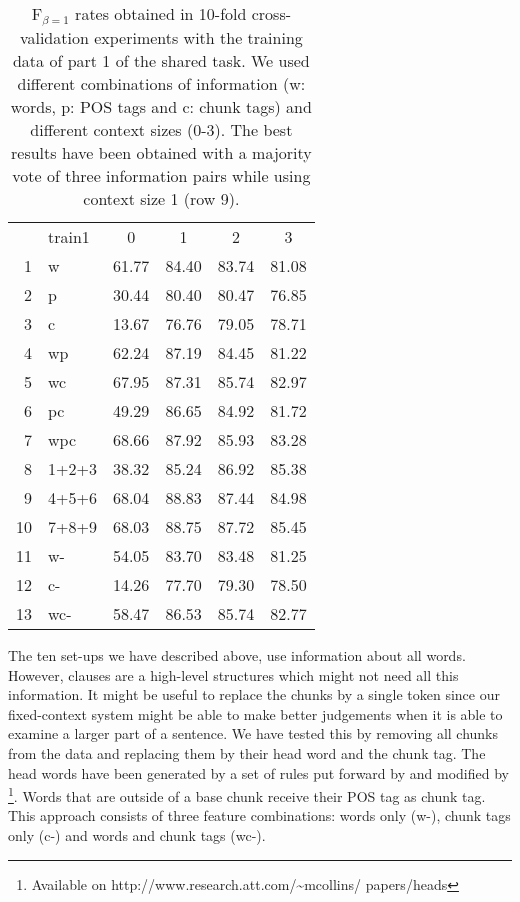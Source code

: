 \documentclass[11pt]{article}
\begin{document}
\begin{table}[t]
\begin{center}
\begin{tabular}{ r|l|c|c|c|c|}\cline{3-6}
\multicolumn{1}{l}{} & \multicolumn{1}{l|}{train1} & 
 0 & 1 & 2 & 3 \\\cline{2-6}
 1 & w         & 61.77 & 84.40 & 83.74 & 81.08\\
 2 & p         & 30.44 & 80.40 & 80.47 & 76.85\\
 3 & c         & 13.67 & 76.76 & 79.05 & 78.71\\
 4 & wp        & 62.24 & 87.19 & 84.45 & 81.22\\
 5 & wc        & 67.95 & 87.31 & 85.74 & 82.97\\
 6 & pc        & 49.29 & 86.65 & 84.92 & 81.72\\
 7 & wpc       & 68.66 & 87.92 & 85.93 & 83.28\\\cline{2-6}
 8 & 1+2+3     & 38.32 & 85.24 & 86.92 & 85.38\\
 9 & 4+5+6     & 68.04 & 88.83 & 87.44 & 84.98\\
10 & 7+8+9     & 68.03 & 88.75 & 87.72 & 85.45\\\cline{2-6}
11 & w-        & 54.05 & 83.70 & 83.48 & 81.25\\
12 & c-        & 14.26 & 77.70 & 79.30 & 78.50\\
13 & wc-       & 58.47 & 86.53 & 85.74 & 82.77\\\cline{2-6}
\end{tabular}
\end{center}
\caption{
F$_{\beta=1}$ rates obtained in 10-fold cross-validation experiments
with the training data of part 1 of the shared task.
We used different combinations of information (w: words, p: POS tags
and c: chunk tags) and different context sizes (0-3).
The best results have been obtained with a majority vote of three
information pairs while using context size 1 (row 9).
} 
\label{tab-result1}
\end{table}

The ten set-ups we have described above, use information about all
words.
However, clauses are a high-level structures which might not need
all this information.
It might be useful to replace the chunks by a single token since our
fixed-context system might be able to make better judgements when
it is able to examine a larger part of a sentence.
We have tested this by removing all chunks from the data and replacing 
them by their head word and the chunk tag.
The head words have been generated by a set of rules put
forward by \cite{magerman95} and modified by 
\cite{collins99}\footnote{Available on
http://www.research.att.com/\~{ }mcollins/ papers/heads}.
Words that are outside of a base chunk receive their POS tag as chunk
tag.
This approach consists of three feature combinations:
words only (w-), chunk tags only (c-) and words and chunk tags (wc-).
\end{document}
